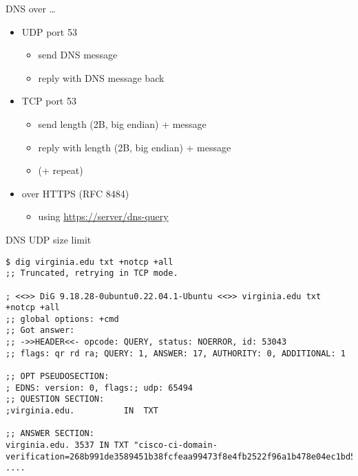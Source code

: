 \begin{frame}{DNS over \ldots}
    \begin{itemize}
    \item UDP port 53
        \begin{itemize}
        \item send DNS message
        \item reply with DNS message back
        \end{itemize}
    \item TCP port 53
        \begin{itemize}
        \item send length (2B, big endian) + message
        \item reply with length (2B, big endian) + message
        \item (+ repeat)
        \end{itemize}
    \item over HTTPS (RFC 8484)
        \begin{itemize}
        \item using \url{https://server/dns-query}
        \end{itemize}
    \end{itemize}
\end{frame}

\begin{frame}[fragile]{DNS UDP size limit}
\begin{Verbatim}[fontsize=\fontsize{9}{10}]
$ dig virginia.edu txt +notcp +all
;; Truncated, retrying in TCP mode.

; <<>> DiG 9.18.28-0ubuntu0.22.04.1-Ubuntu <<>> virginia.edu txt +notcp +all
;; global options: +cmd
;; Got answer:
;; ->>HEADER<<- opcode: QUERY, status: NOERROR, id: 53043
;; flags: qr rd ra; QUERY: 1, ANSWER: 17, AUTHORITY: 0, ADDITIONAL: 1

;; OPT PSEUDOSECTION:
; EDNS: version: 0, flags:; udp: 65494
;; QUESTION SECTION:
;virginia.edu.			IN	TXT

;; ANSWER SECTION:
virginia.edu. 3537 IN TXT "cisco-ci-domain-verification=268b991de3589451b38fcfeaa99473f8e4fb2522f96a1b478e04ec1bd5a25ff9"
....
\end{Verbatim}
\end{frame}

